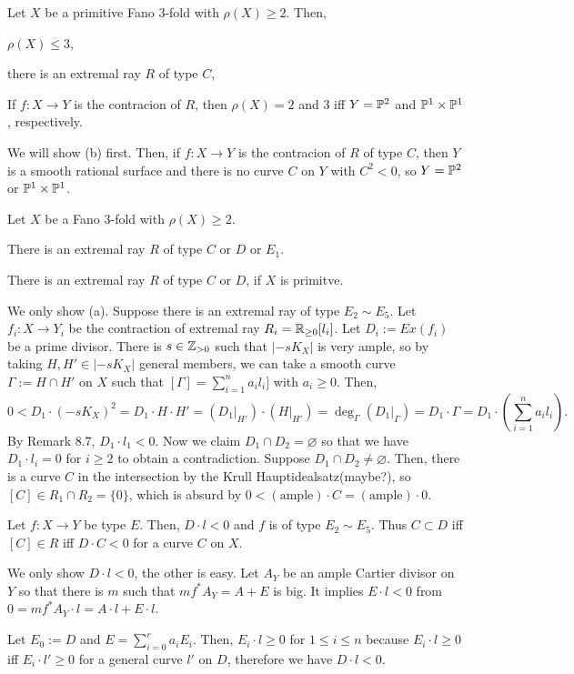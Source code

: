 \documentclass{../../small}
\begin{document}
\begin{thm}
Let $X$ be a primitive Fano 3-fold with $\rho(X)\ge2$.
Then,
\begin{parts}
\item $\rho(X)\le3$,
\item there is an extremal ray $R$ of type $C$,
\item If $f:X\to Y$ is the contracion of $R$, then $\rho(X)=2$ and $3$ iff $Y=\P^2$ and $\P^1\times\P^1$, respectively.
\end{parts}
\end{thm}
\begin{pf}
We will show (b) first.
Then, if $f:X\to Y$ is the contracion of $R$ of type $C$, then $Y$ is a smooth rational surface and there is no curve $C$ on $Y$ with $C^2<0$, so $Y=\P^2$ or $\P^1\times\P^1$.
\end{pf}

\begin{lem}
Let $X$ be a Fano 3-fold with $\rho(X)\ge2$.
\begin{parts}
\item There is an extremal ray $R$ of type $C$ or $D$ or $E_1$.
\item There is an extremal ray $R$ of type $C$ or $D$, if $X$ is primitve.
\end{parts}
\end{lem}
\begin{pf}
We only show (a).
Suppose there is an extremal ray of type $E_2\sim E_5$.
Let $f_i:X\to Y_i$ be the contraction of extremal ray $R_i=\R_{\ge0}[l_i]$.
Let $D_i:=Ex(f_i)$ be a prime divisor.
There is $s\in\Z_{>0}$ such that $|-sK_X|$ is very ample, so by taking $H,H'\in|-sK_X|$ general members, we can take a smooth curve $\Gamma:=H\cap H'$ on $X$ such that $[\Gamma]=\sum_{i=1}^na_il_i]$ with $a_i\ge0$.
Then,
\[0<D_1\cdot(-sK_X)^2=D_1\cdot H\cdot H'=(D_1|_{H'})\cdot(H|_{H'})=\deg_{\Gamma}(D_1|_\Gamma)=D_1\cdot\Gamma=D_1\cdot(\sum_{i=1}^na_il_i).\]
By Remark 8.7, $D_1\cdot l_1<0$.
Now we claim $D_1\cap D_2=\varnothing$ so that we have $D_1\cdot l_i=0$ for $i\ge2$ to obtain a contradiction.
Suppose $D_1\cap D_2\ne\varnothing$.
Then, there is a curve $C$ in the intersection by the Krull Hauptidealsatz(maybe?), so $[C]\in R_1\cap R_2=\{0\}$, which is absurd by $0<(\text{ample})\cdot C=(\text{ample})\cdot0$. 
\end{pf}

\begin{rmk}
Let $f:X\to Y$ be type $E$.
Then, $D\cdot l<0$ and $f$ is of type $E_2\sim E_5$.
Thus $C\subset D$ iff $[C]\in R$ iff $D\cdot C<0$ for a curve $C$ on $X$.
\end{rmk}
\begin{pf}
We only show $D\cdot l<0$, the other is easy.
Let $A_Y$ be an ample Cartier divisor on $Y$ so that there is $m$ such that $mf^*A_Y=A+E$ is big.
It implies $E\cdot l<0$ from $0=mf^*A_Y\cdot l=A\cdot l+E\cdot l$.

Let $E_0:=D$ and $E=\sum_{i=0}^ra_iE_i$.
Then, $E_i\cdot l\ge0$ for $1\le i\le n$ because $E_i\cdot l\ge0$ iff $E_i\cdot l'\ge0$ for a general curve $l'$ on $D$, therefore we have $D\cdot l<0$.
\end{pf}
\end{document}
